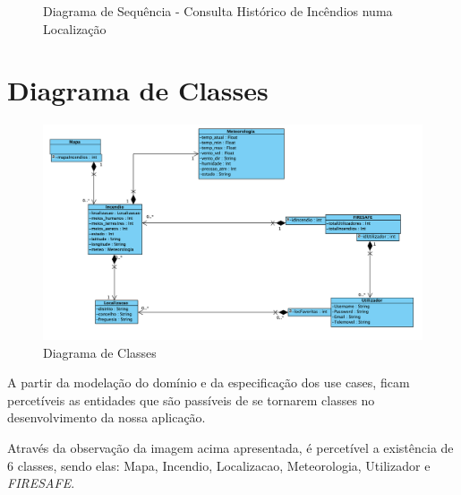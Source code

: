 \documentclass[a4paper,12pt]{scrreprt}
\newcommand{\tab}{
    \hspace{1cm}}
\begin{document}
\begin{figure}[hbt!]
    \centering
    \caption{Diagrama de Sequência - Consulta Histórico de Incêndios numa Localização}
\end{figure}


\chapter{Diagrama de Classes}

\begin{figure}[hbt!]
    \centering
    \includegraphics[width=1\textwidth]{images/Fase2/8.DiagramaDeClasses/diagramaClasses.png}
    \caption{Diagrama de Classes}
\end{figure}

\tab A partir da modelação do domínio e da especificação dos use cases, ficam percetíveis as entidades que são passíveis de se tornarem classes no desenvolvimento da nossa aplicação.

\tab Através da observação da imagem acima apresentada, é percetível a existência de 6 classes, sendo elas: Mapa, Incendio, Localizacao, Meteorologia, Utilizador e \textit{FIRESAFE}.
\end{document}
